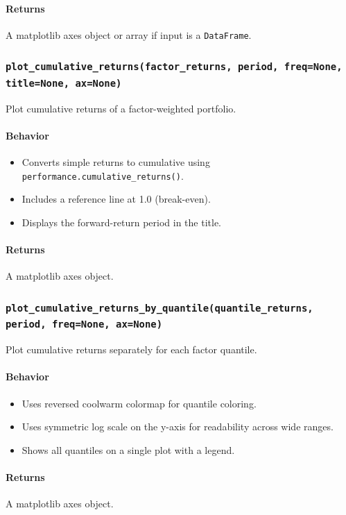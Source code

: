\documentclass[11pt]{article}
\begin{document}
\paragraph{Returns}
A matplotlib axes object or array if input is a \texttt{DataFrame}.

\subsubsection{\texttt{plot\_cumulative\_returns(factor\_returns, period, freq=None, title=None, ax=None)}}
Plot cumulative returns of a factor-weighted portfolio.

\paragraph{Behavior}
\begin{itemize}
  \item Converts simple returns to cumulative using \texttt{performance.cumulative\_returns()}.
  \item Includes a reference line at 1.0 (break-even).
  \item Displays the forward-return period in the title.
\end{itemize}

\paragraph{Returns}
A matplotlib axes object.

\subsubsection{\texttt{plot\_cumulative\_returns\_by\_quantile(quantile\_returns, period, freq=None, ax=None)}}
Plot cumulative returns separately for each factor quantile.

\paragraph{Behavior}
\begin{itemize}
  \item Uses reversed coolwarm colormap for quantile coloring.
  \item Uses symmetric log scale on the y-axis for readability across wide ranges.
  \item Shows all quantiles on a single plot with a legend.
\end{itemize}

\paragraph{Returns}
A matplotlib axes object.
\end{document}
